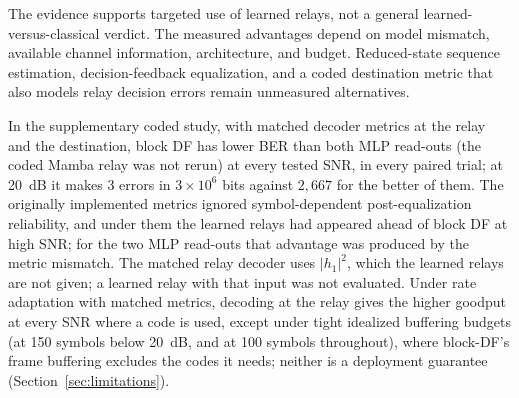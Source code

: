The evidence supports targeted use of learned relays, not a general learned-versus-classical verdict. The measured advantages depend on model mismatch, available channel information, architecture, and budget. Reduced-state sequence estimation, decision-feedback equalization, and a coded destination metric that also models relay decision errors remain unmeasured alternatives.

In the supplementary coded study, with matched decoder metrics at the relay and the destination, block DF has lower BER than both MLP read-outs (the coded Mamba relay was not rerun) at every tested SNR, in every paired trial; at 20~dB it makes 3 errors in $3\times10^{6}$ bits against $2{,}667$ for the better of them. The originally implemented metrics ignored symbol-dependent post-equalization reliability, and under them the learned relays had appeared ahead of block DF at high SNR; for the two MLP read-outs that advantage was produced by the metric mismatch. The matched relay decoder uses $|h_1|^2$, which the learned relays are not given; a learned relay with that input was not evaluated. Under rate adaptation with matched metrics, decoding at the relay gives the higher goodput at every SNR where a code is used, except under tight idealized buffering budgets (at 150 symbols below 20~dB, and at 100 symbols throughout), where block-DF's frame buffering excludes the codes it needs; neither is a deployment guarantee (Section~\ref{sec:limitations}).

